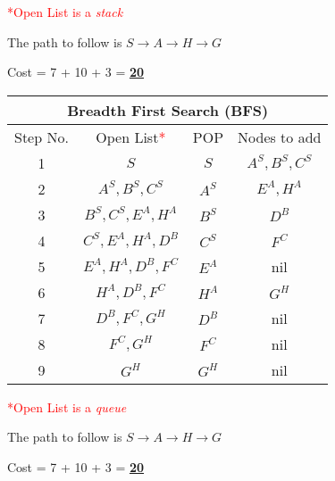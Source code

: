 \documentclass[12pt, letterpaper]{article}
\begin{document}
\textcolor{red}{*Open List is a \textit{stack}}

The path to follow is $S\rightarrow A\rightarrow H\rightarrow G$

Cost = 7 + 10 + 3 = \underline{\textbf{20}}

\begin{center}
    \begin{tabular}{|c|c|c|c|}
    \hline
    \multicolumn{4}{|c|}{Breadth First Search (\textbf{BFS})}\\
    \hline
    Step No. & Open List\textcolor{red}{*} & POP & Nodes to add \\ 
    \hline
    1 & $S$ & $S$ & $A^S, B^S, C^S$ \\
    \hline
    2 & $A^S, B^S, C^S$ & $A^S$ & $E^A,H^A$ \\
    \hline
    3 & $B^S, C^S, E^A, H^A$ & $B^S$ & $D^B$ \\
    \hline
    4 & $C^S, E^A, H^A, D^B$ & $C^S$ & $F^C$ \\
    \hline
    5 & $E^A,H^A,D^B,F^C$ & $E^A$ & nil \\
    \hline
    6 & $H^A,D^B,F^C$ & $H^A$  & $G^H$ \\
    \hline
    7 & $D^B,F^C,G^H$ & $D^B$  & nil \\
    \hline
    8 & $F^C,G^H$ & $F^C$  & nil \\
    \hline
    9 & $G^H$ & $G^H$  & nil \\
    \hline
    \end{tabular}
\end{center}

\textcolor{red}{*Open List is a \textit{queue}}

The path to follow is $S\rightarrow A\rightarrow H\rightarrow G$

Cost = 7 + 10 + 3 = \underline{\textbf{20}}
\end{document}

